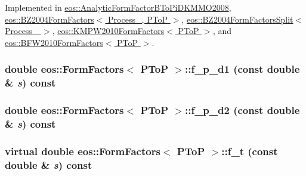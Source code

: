 Implemented in \hyperlink{classeos_1_1AnalyticFormFactorBToPiDKMMO2008_acc3cbe21d5bab4ee23a457b757749bbf}{eos::AnalyticFormFactorBToPiDKMMO2008}, \hyperlink{classeos_1_1BZ2004FormFactors_3_01Process___00_01PToP_01_4_aa8cda87a04cbfced508534de89f95e7d}{eos::BZ2004FormFactors$<$ Process\_\-, PToP $>$}, \hyperlink{classeos_1_1BZ2004FormFactorsSplit_a58d02490b96eaea8923e8252205ec60a}{eos::BZ2004FormFactorsSplit$<$ Process\_\- $>$}, \hyperlink{classeos_1_1KMPW2010FormFactors_3_01PToP_01_4_ab0d16ba2b523915c8f6169bb8783ffd0}{eos::KMPW2010FormFactors$<$ PToP $>$}, and \hyperlink{classeos_1_1BFW2010FormFactors_3_01PToP_01_4_aa059ad4f00d290d3729b9b6bed6be171}{eos::BFW2010FormFactors$<$ PToP $>$}.\hypertarget{classeos_1_1FormFactors_3_01PToP_01_4_a16406f05b7715291b392f856fff988e2}{
\subsubsection[{f\_\-p\_\-d1}]{\setlength{\rightskip}{0pt plus 5cm}double eos::FormFactors$<$ {\bf PToP} $>$::f\_\-p\_\-d1 (const double \& {\em s}) const}}
\label{classeos_1_1FormFactors_3_01PToP_01_4_a16406f05b7715291b392f856fff988e2}
\hypertarget{classeos_1_1FormFactors_3_01PToP_01_4_a875a81786cd947c56c0cdc1737455707}{
\subsubsection[{f\_\-p\_\-d2}]{\setlength{\rightskip}{0pt plus 5cm}double eos::FormFactors$<$ {\bf PToP} $>$::f\_\-p\_\-d2 (const double \& {\em s}) const}}
\label{classeos_1_1FormFactors_3_01PToP_01_4_a875a81786cd947c56c0cdc1737455707}
\hypertarget{classeos_1_1FormFactors_3_01PToP_01_4_ae753d67d42936bd32b043838e7fb769a}{
\subsubsection[{f\_\-t}]{\setlength{\rightskip}{0pt plus 5cm}virtual double eos::FormFactors$<$ {\bf PToP} $>$::f\_\-t (const double \& {\em s}) const}}
\label{classeos_1_1FormFactors_3_01PToP_01_4_ae753d67d42936bd32b043838e7fb769a}


